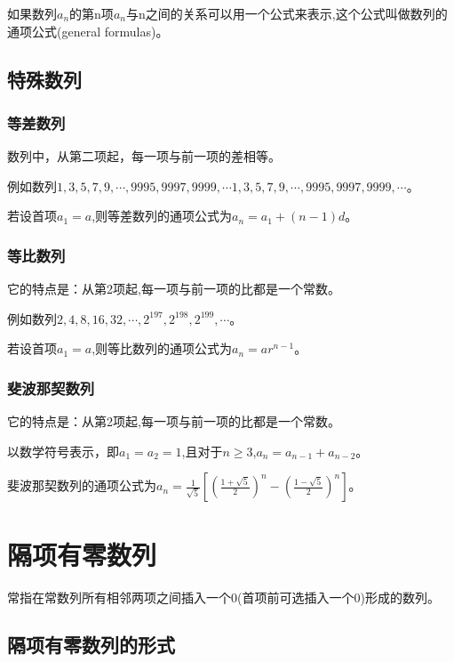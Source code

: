 \documentclass[final,3p,times,onecolumn]{elsarticle}
\begin{document}
如果数列${a_n}$的第n项$a_n$与n之间的关系可以用一个公式来表示,这个公式叫做数列的通项公式(general formulas)。

\subsection{特殊数列}

\subsubsection{等差数列}

数列中，从第二项起，每一项与前一项的差相等。

例如数列${\displaystyle 1,3,5,7,9,\cdots ,9995,9997,9999,\cdots }1,3,5,7,9,\cdots ,9995,9997,9999,\cdots$。

若设首项$a_{1}=a$,则等差数列的通项公式为$a_{n}=a_{1}+(n-1)d$。

\subsubsection{等比数列}

它的特点是：从第2项起,每一项与前一项的比都是一个常数。

例如数列$2,4,8,16,32,\cdots ,2^{197},2^{198},2^{199},\cdots$。

若设首项$a_{1}=a$,则等比数列的通项公式为$a_{n}=ar^{n-1}$。

\subsubsection{斐波那契数列}

它的特点是：从第2项起,每一项与前一项的比都是一个常数。

以数学符号表示，即$a_{1}=a_{2}=1$,且对于$n\geq 3$,$a_{n}=a_{n-1}+a_{n-2}$。

斐波那契数列的通项公式为$a_{n}={\frac {1}{\sqrt {5}}}[({\frac {1+{\sqrt {5}}}{2}})^{n}-({\frac {1-{\sqrt {5}}}{2}})^{n}]$。

\section{隔项有零数列}

常指在常数列所有相邻两项之间插入一个0(首项前可选插入一个0)形成的数列。

\subsection{隔项有零数列的形式}
\end{document}
